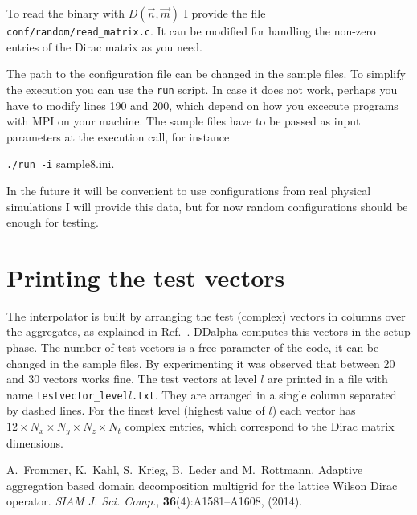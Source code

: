 \documentclass[a4paper,12pt]{scrartcl}
\begin{document}
To read the binary with $D(\vec{n},\vec{m})$ I provide the file \texttt{conf/random/read\_matrix.c}. It can be modified for handling the non-zero entries of the Dirac matrix as you need.

\hspace{2mm}
 
The path to the configuration file can be changed in the sample files. To simplify the execution you can use the \texttt{run} script. In case it does not work, perhaps you have to modify lines 190 and 200, which depend on how you excecute programs with MPI on your machine. The sample files have to be passed as input parameters at the execution call, for instance \begin{center}

\texttt{./run -i} sample8.ini.                                                                                                                                                                                                                                                            \end{center}


In the future it will be convenient to use configurations from real physical simulations I will provide this data, but for now random configurations should be enough for testing.


\section{Printing the test vectors}
The interpolator is built by arranging the test (complex) vectors in columns over the aggregates, as explained in Ref.\ \cite{Frommer}. DDalpha computes this vectors in the setup phase. The number of test vectors is a free parameter of the code, it can be changed in the sample files. By experimenting it was observed that between 20 and 30 vectors works fine. The test vectors at level $l$ are printed in a file with name \texttt{testvector\_level$l$.txt}. They are arranged in a single column separated by dashed lines. For the finest level (highest value of $l$) each vector has $12\times N_x\times N_y\times N_z\times N_t$ complex entries, which correspond to the Dirac matrix dimensions.





\begin{thebibliography}{X}
A.\ Frommer, K.\ Kahl, S.\ Krieg, B.\ Leder and M.\ Rottmann. Adaptive aggregation based domain decomposition multigrid for the lattice Wilson Dirac operator. \textit{SIAM J. Sci. Comp.}, \textbf{36}(4):A1581--A1608, (2014).
\end{thebibliography}
\end{document}
